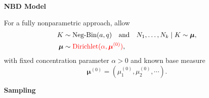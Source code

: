 \documentclass[portrait,a0b,final]{a0poster}
\newcommand{\clusters}{\bm{\kappa}}
\newcommand{\sizes}{\bm{\mu}}
\newcommand{\g}{\,|\,}
\newenvironment{poster}{
  \begin{center}
  \begin{minipage}[c]{0.98\textwidth}
}{
  \end{minipage}
  \end{center}
}
\begin{document}
\begin{poster}
\begin{multicols}{3}
%  
%  

\begin{center}
\textbf{NBD Model}
\end{center}

For a fully nonparametric approach, allow
\begin{align*}
K &\sim \text{Neg-Bin}(a,q)
\quad \textrm{and} \quad
N_1,\ldots, N_k \mid K \sim \bm{\mu},\\
\bm{\mu} &\sim \textcolor{red}{\text{Dirichlet}(\alpha, \sizes^{(0)})},
\end{align*}
with fixed concentration parameter $\alpha>0$
and known base measure $$\sizes^{(0)}=(\mu^{(0)}_1,\mu^{(0)}_2,\cdots).$$
\begin{center}
\textbf{Sampling}
\end{center}


\end{multicols}
\end{poster}
\end{document}
